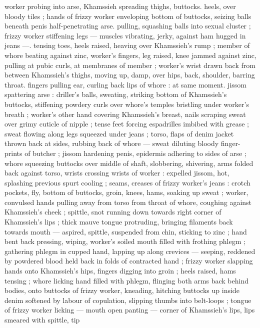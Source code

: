 worker probing into arse, Khamssieh spreading thighs, buttocks. 
heels, over bloody tiles ; hands of frizzy worker enveloping bottom 
of buttocks, seizing balls beneath penis half-penetrating arse. 
pulling, squashing balls into sexual cluster ; frizzy worker stiffening 
legs --- muscles vibrating, jerky, against ham hugged in jeans ---. 
tensing toes, heels raised, heaving over Khamssieh's rump ; member 
of whore beating against zinc, worker's fingers, leg raised, knee 
jammed against zinc, pulling at pubic curls, at membranes of 
member ; worker's wrist drawn back from between Khamssieh's 
thighs, moving up, damp, over hips, back, shoulder, barring throat. 
fingers pulling ear, curling back lips of whore : at same moment. 
jissom spattering arse : driller's balls, sweating, striking bottom of 
Khamssieh's buttocks, stiffening powdery curls over whore's temples 
bristling under worker's breath ; worker's other hand covering 
Khamssieh's breast, nails scraping sweat over grimy cuticle of nipple 
; tense feet forcing espadrilles imbibed with grease ; sweat flowing 
along legs squeezed under jeans ; torso, flaps of denim jacket 
thrown back at sides, rubbing back of whore --- sweat diluting 
bloody finger-prints of butcher ; jissom hardening penis, epidermis 
adhering to sides of arse ; whore squeezing buttocks over middle of 
shaft, slobbering, shivering, arms folded back against torso, wrists 
crossing wrists of worker : expelled jissom, hot, splashing previous 
spurt cooling ; seams, creases of frizzy worker's jeans : crotch 
pockets, fly, bottom of buttocks, groin, knees, hams, soaking up 
sweat ; worker, convulsed hands pulling away from torso from throat 
of whore, coughing against Khamssieh's cheek ; spittle, snot 
running down towards right corner of Khamssieh's lips ; thick mauve 
tongue protruding, bringing filaments back towards mouth --- 
aspired, spittle, suspended from chin, sticking to zinc ; hand bent 
back pressing, wiping, worker's soiled mouth filled with frothing 
phlegm ; gathering phlegm in cupped hand, lapping up along 
crevices --- seeping, reddened by powdered blood held back in folds 
of contracted hand ; frizzy worker slapping hands onto Khamssieh's 
hips, fingers digging into groin ; heels raised, hams tensing ; whore 
licking hand filled with phlegm, flinging both arms back behind 
bodies, onto buttocks of frizzy worker, kneading, hitching buttocks 
up inside denim softened by labour of copulation, slipping thumbs 
into belt-loops ; tongue of frizzy worker licking --- mouth open 
panting --- corner of Khamssieh's lips, lips smeared with spittle, tip 
